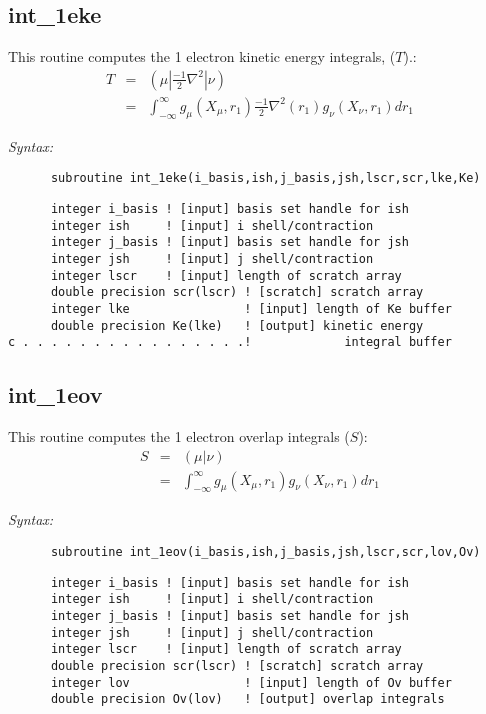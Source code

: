 \subsection{int\_1eke} 
This routine computes the 1 electron kinetic energy integrals, ($T$).: 
\begin{eqnarray*} 
T & = & ({\mu}|\frac{-1}{2}\nabla^{2}|{\nu}) \\ 
  & = & \int_{-\infty}^{\infty} g_{\mu}(X_{\mu},r_{1})\frac{-1}{2}\nabla^{2}(r_{1})g_{\nu}(X_{\nu},r_{1})dr_{1} 
\end{eqnarray*} 
 
{\it Syntax:} 
\begin{verbatim} 
      subroutine int_1eke(i_basis,ish,j_basis,jsh,lscr,scr,lke,Ke) 
\end{verbatim} 
\begin{verbatim} 
      integer i_basis ! [input] basis set handle for ish 
      integer ish     ! [input] i shell/contraction 
      integer j_basis ! [input] basis set handle for jsh 
      integer jsh     ! [input] j shell/contraction 
      integer lscr    ! [input] length of scratch array 
      double precision scr(lscr) ! [scratch] scratch array 
      integer lke                ! [input] length of Ke buffer 
      double precision Ke(lke)   ! [output] kinetic energy  
c . . . . . . . . . . . . . . . .!             integral buffer 
\end{verbatim} 
\subsection{int\_1eov} 
This routine computes the 1 electron overlap integrals ($S$): 
\begin{eqnarray*} 
S & = & ({\mu}|{\nu}) \\ 
  & = & \int_{-\infty}^{\infty} g_{\mu}(X_{\mu},r_{1})g_{\nu}(X_{\nu},r_{1})dr_{1} 
\end{eqnarray*} 
 
{\it Syntax:} 
\begin{verbatim} 
      subroutine int_1eov(i_basis,ish,j_basis,jsh,lscr,scr,lov,Ov) 
\end{verbatim} 
\begin{verbatim} 
      integer i_basis ! [input] basis set handle for ish 
      integer ish     ! [input] i shell/contraction 
      integer j_basis ! [input] basis set handle for jsh 
      integer jsh     ! [input] j shell/contraction 
      integer lscr    ! [input] length of scratch array 
      double precision scr(lscr) ! [scratch] scratch array 
      integer lov                ! [input] length of Ov buffer 
      double precision Ov(lov)   ! [output] overlap integrals 
\end{verbatim} 
